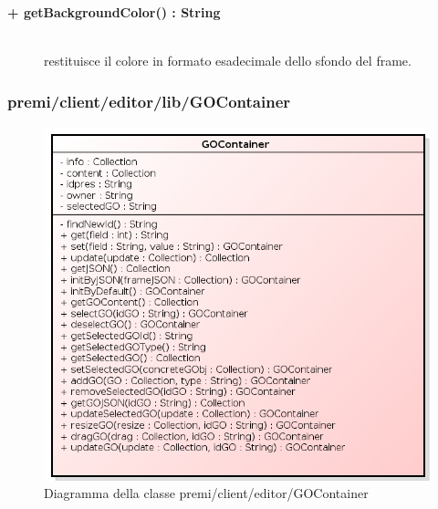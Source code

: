\begin{description}
\begin{description}
\begin{description}
\end{description}

\begin{description} 
		\item[\textbf{\color{blue}+ getBackgroundColor() : String			}] \hfill \\
			restituisce il colore in formato esadecimale dello sfondo del frame.     

\end{description}



\end{description}

\end{description}


\subsubsection{premi/client/editor/lib/GOContainer}
\begin{figure}[h]
\begin{center}
\includegraphics[scale=0.40]{img/diacla/GOContainer.png}
\caption{Diagramma della classe premi/client/editor/GOContainer}
\end{center}
\end{figure}

